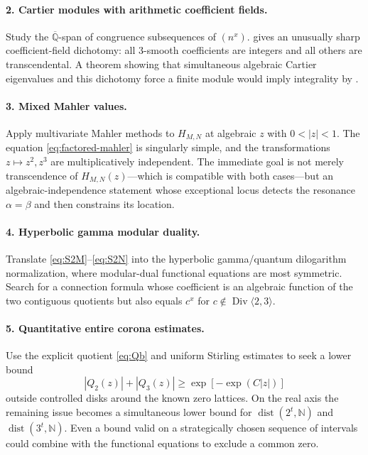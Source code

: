 \documentclass[11pt]{article}
\numberwithin{equation}{section}
\theoremstyle{definition}
\theoremstyle{remark}
\newcommand{\N}{\mathbb{N}}
\newcommand{\Qbar}{\overline{\mathbb{Q}}}
\newcommand{\Div}{\operatorname{Div}}
\newcommand{\dist}{\operatorname{dist}}
\begin{document}
\paragraph{2. Cartier modules with arithmetic coefficient fields.}
Study the $\Qbar$-span of congruence subsequences of $(n^x)$.   gives an unusually sharp coefficient-field dichotomy: all $3$-smooth coefficients are integers and all others are transcendental.  A theorem showing that simultaneous algebraic Cartier eigenvalues and this dichotomy force a finite module would imply integrality by .

\paragraph{3. Mixed Mahler values.}
Apply multivariate Mahler methods to $H_{M,N}$ at algebraic $z$ with $0<|z|<1$.  The equation \eqref{eq:factored-mahler} is singularly simple, and the transformations $z\mapsto z^2,z^3$ are multiplicatively independent.  The immediate goal is not merely transcendence of $H_{M,N}(z)$---which is compatible with both cases---but an algebraic-independence statement whose exceptional locus detects the resonance $\alpha=\beta$ and then constrains its location.

\paragraph{4. Hyperbolic gamma modular duality.}
Translate \eqref{eq:S2M}--\eqref{eq:S2N} into the hyperbolic gamma/quantum dilogarithm normalization, where modular-dual functional equations are most symmetric.  Search for a connection formula whose coefficient is an algebraic function of the two contiguous quotients but also equals $c^x$ for $c\notin\Div\langle2,3\rangle$.

\paragraph{5. Quantitative entire corona estimates.}
Use the explicit quotient \eqref{eq:Qb} and uniform Stirling estimates to seek a lower bound
\[
 |Q_2(z)|+|Q_3(z)|\ge \exp[-\exp(C|z|)]
\]
outside controlled disks around the known zero lattices.  On the real axis the remaining issue becomes a simultaneous lower bound for $\dist(2^t,\N)$ and $\dist(3^t,\N)$.  Even a bound valid on a strategically chosen sequence of intervals could combine with the functional equations to exclude a common zero.
\end{document}
